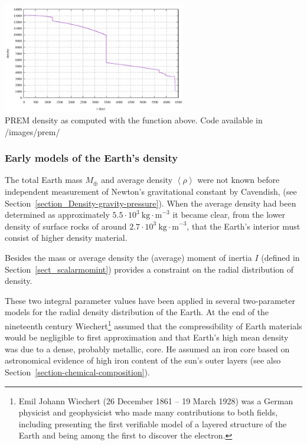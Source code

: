 \begin{center}
\includegraphics[width=8cm]{images/prem/rho.pdf}\\
{\captionfont PREM density as computed with the function above. 
Code available in /images/prem/} 
\end{center}


\subsubsection{Early models of the Earth's density}

The total Earth mass $M_{\oplus}$ and average density $\left <\rho \right >$
were not known 
before independent measurement of Newton's gravitational 
constant by Cavendish, 
(see Section~\ref{section_Density-gravity-pressure}).
When the average density had been determined as approximately 
$5.5 \cdot 10^3~\mathrm{kg\cdot m}^{-3}$ it became clear, 
from the lower density of surface rocks of around 
$2.7 \cdot 10^3~\mathrm{kg\cdot m}^{-3}$,
that the Earth's interior must consist of higher density material.

Besides the mass or average density the (average) 
moment of inertia $I$ (defined in Section~\ref{sect_scalarmomint}) 
provides a constraint on the radial distribution of density.
     
These two integral parameter values have been applied in several 
two-parameter models for the radial density distribution of the Earth.
At the end of the nineteenth century Wiechert\footnote{Emil Johann 
Wiechert (26 December 1861 – 19 March 1928) was a German physicist 
and geophysicist who made many contributions to both fields, 
including presenting the first verifiable model of a layered structure of the 
Earth and being among the first to discover the electron.} assumed that the 
compressibility of Earth materials would be negligible to first
approximation and that Earth's high mean density was due to a dense,
probably metallic, core.
He assumed an iron core based on astronomical evidence of high iron
content of the sun's outer layers 
(see also Section~\ref{section-chemical-composition}).

